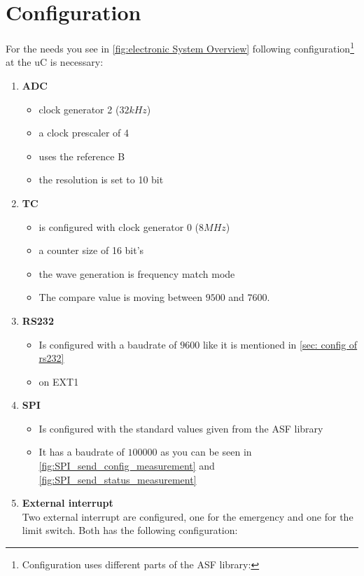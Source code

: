 \documentclass[a4paper,12pt]{scrreprt}
\begin{document}
\section{Configuration}\label{sec:config_uc}
For the needs you see in \autoref{fig:electronic System Overview} following configuration\footnote{Configuration uses different parts of the \acs{ASF} library:} at the \acs{uC} is necessary:
\begin{enumerate}
\item\textbf{ \acs{ADC}} 
\begin{itemize}
\item clock generator 2 (3$2kHz$)
\item a clock prescaler of 4
\item uses the reference B
\item the resolution is set to 10 bit
\end{itemize}
\item \textbf{\acs{TC}}
\begin{itemize}
\item is configured with clock generator 0 ($8MHz$)
\item a counter size of 16 bit's
\item the wave generation is frequency match mode
\item The compare value is moving between $9500$ and $7600$.
\end{itemize}
\item \textbf{\acs{RS232}}
\begin{itemize}
\item Is configured with a baudrate of $9600$ like it is mentioned in \autoref{sec: config of rs232}
\item on EXT1
\end{itemize}
\item \textbf{\acs{SPI}}
\begin{itemize}
\item Is configured with the standard values given from the \acs{ASF} library
\item It has a baudrate of $100000$ as you can be seen in  \autoref{fig:SPI_send_config_measurement} and \autoref{fig:SPI_send_status_measurement}
\end{itemize}
\item \textbf{External interrupt}\\
Two external interrupt are configured, one for the emergency and one for the limit switch. Both has the following configuration:
\begin{itemize}

\end{itemize}
\end{enumerate}
\end{document}
